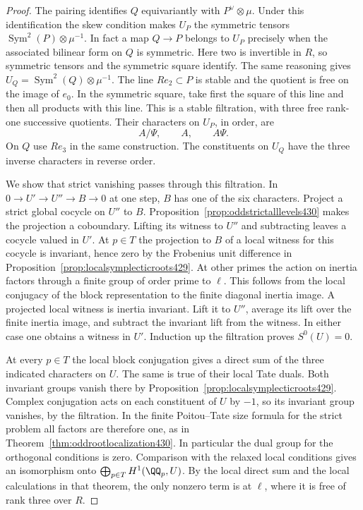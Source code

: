 \documentclass[a4paper,11pt]{article}
\theoremstyle{definition}
\theoremstyle{remark}
\numberwithin{equation}{section}
\begin{document}
\begin{proof}
The pairing identifies \(Q\) equivariantly with
\(P^\vee\otimes\mu\). Under this identification the skew
condition makes \(U_P\) the symmetric tensors
\(\operatorname{Sym}^2(P)\otimes\mu^{-1}\).
In fact a map \(Q\to P\) belongs to \(U_P\) precisely when
the associated bilinear form on \(Q\) is symmetric. Here two
is invertible in \(R\), so symmetric tensors and the symmetric
square identify. The same reasoning gives
\(U_Q=\operatorname{Sym}^2(Q)\otimes\mu^{-1}\).
The line \(Re_2\subset P\) is stable and the quotient is free
on the image of \(e_0\). In the symmetric square, take first
the square of this line and then all products with this line.
This is a stable filtration, with three free rank-one successive
quotients. Their characters on \(U_P\), in order, are
\[
              A/\Psi,\qquad A,\qquad A\Psi .
\]
On \(Q\) use \(Re_3\) in the same construction. The
constituents on \(U_Q\) have the three inverse characters
in reverse order.

We show that strict vanishing passes through this filtration.
In \(0\to U'\to U''\to B\to0\) at one step, \(B\) has one
of the six characters. Project a strict global cocycle on \(U''\)
to \(B\). Proposition~\ref{prop:oddstrictalllevels430} makes
the projection a coboundary. Lifting its witness to \(U''\)
and subtracting leaves a cocycle valued in \(U'\).
At \(p\in T\) the projection to \(B\) of a local witness for
this cocycle is invariant, hence zero by the Frobenius unit
difference in Proposition~\ref{prop:localsymplecticroots429}.
At other primes the action on inertia factors through a finite
group of order prime to \(\ell\). This follows from the local
conjugacy of the block representation to the finite diagonal
inertia image. A projected local witness is inertia invariant.
Lift it to \(U''\), average its lift over the finite inertia
image, and subtract the invariant lift from the witness.
In either case one obtains a witness in \(U'\). Induction
up the filtration proves \(S^0(U)=0\).

At every \(p\in T\) the local block conjugation gives a direct
sum of the three indicated characters on \(U\). The same is
true of their local Tate duals. Both invariant groups vanish
there by Proposition~\ref{prop:localsymplecticroots429}.
Complex conjugation acts on each constituent of \(U\) by
\(-1\), so its invariant group vanishes, by the filtration.
In the finite Poitou--Tate size formula for the strict problem
all factors are therefore one, as in
Theorem~\ref{thm:oddrootlocalization430}. In particular the
dual group for the orthogonal conditions is zero.
Comparison with the relaxed local conditions gives an
isomorphism onto \(\bigoplus_{p\in T}H^1(\QQ_p,U)\).
By the local direct sum and the local calculations in that
theorem, the only nonzero term is at \(\ell\), where it is
free of rank three over \(R\).
\end{proof}
\end{document}
